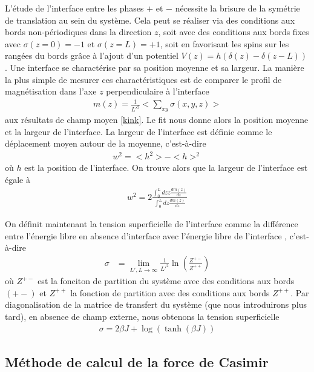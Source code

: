 L'étude de l'interface entre les phases $+$ et $-$ nécessite la brisure de la symétrie de translation au sein du système. Cela peut se réaliser via des conditions aux bords non-périodiques dans la direction $z$, soit avec des conditions aux bords fixes avec $\sigma(z=0) = -1$ et $\sigma(z=L)=+1$, soit en favorisant les spins sur les rangées du bords grâce à l'ajout d'un potentiel $V(z) = h (\delta(z)-\delta(z-L))$.
Une interface se charactérise par sa position moyenne et sa largeur. La manière la plus simple de mesurer ces charactéristiques est de comparer le profil de magnétisation \cite{stecki_magnetization_1994}  dans l'axe $z$ perpendiculaire à l'interface
\begin{align}
    m(z) = \frac{1}{L'^2} < \sum_{xy} \sigma(x,y,z) >
\end{align}
aux résultats de champ moyen \ref{kink}. Le fit nous donne alors la position moyenne et la largeur de l'interface. La largeur de l'interface est définie comme le déplacement moyen autour de la moyenne, c'est-à-dire
\begin{align}
    w^2 = <h^2>-<h>^2
\end{align}
où $h$ est la position de l'interface. On trouve alors que la largeur de l'interface est égale à
\begin{align}
    w^2 = 2 \frac{ \int_0^L dz z \frac{d m(z)}{dz}}{\int_0^L dz \frac{d m(z)}{dz}}
\end{align}
 
On définit maintenant la tension superficielle de l'interface comme la différence entre l'énergie libre en absence d'interface avec l'énergie libre de l'interface \cite{abraham_transfer_1973,abraham_interface_1976,richards_numerical_1993}, c'est-à-dire
\begin{align}
    \sigma &= \lim_{L',L \to \infty} \frac{1}{L'^2} \ln \left( \frac{Z^{+-}}{Z^{++}} \right) 
\end{align}
où $Z^{+-}$ est la fonciton de partition du système avec des conditions aux bords $(+-)$ et $Z^{++}$ la fonction de partition avec des conditions aux bords $Z^{++}$.
Par diagonalisation de la matrice de transfert du système (que nous introduirons plus tard), en absence de champ externe, nous obtenons la tension superficielle
\begin{align}
    \sigma = 2 \beta J + \log(\tanh(\beta J))    
\end{align}

    \subsection{Méthode de calcul de la force de Casimir}

